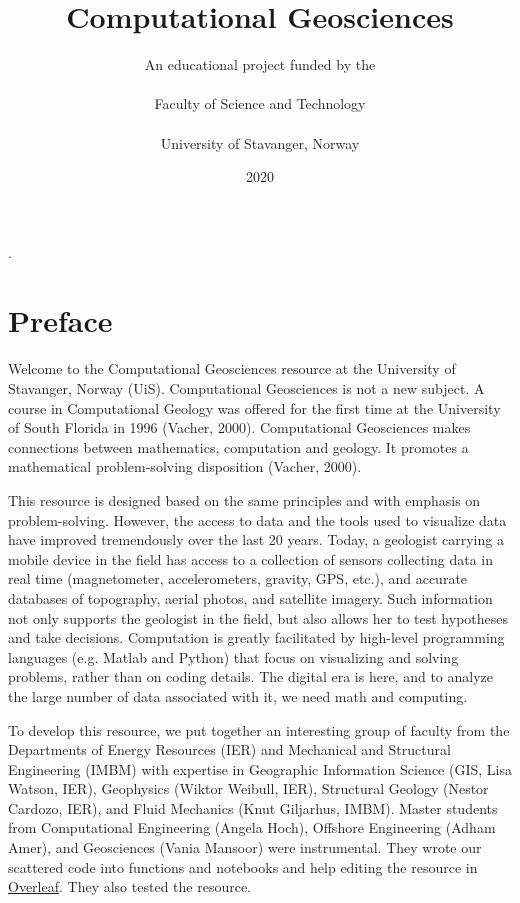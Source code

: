 \documentclass[a4paper , 12pt]{book}
\begin{document}

\lstset{style=mystyle}
\lstset{language=Python,upquote=true} %
\title{Computational Geosciences}
\author{An educational project funded by the \\ \\ Faculty of Science and Technology \\ \\ University of Stavanger, Norway}
\date{2020}

\setlength{\parindent}{0pt}.
\setlength{\parskip}{1em}
\renewcommand{\baselinestretch}{1.}

\maketitle
{}

\section*{Preface}

Welcome to the Computational Geosciences resource at the University of Stavanger, Norway (UiS). Computational Geosciences is not a new subject. A course in Computational Geology was offered for the first time at the University of South Florida in 1996 (Vacher, 2000). Computational Geosciences makes connections between mathematics, computation and geology. It promotes a mathematical problem-solving disposition (Vacher, 2000). 

This resource is designed based on the same principles and with emphasis on problem-solving. However, the access to data and the tools used to visualize data have improved tremendously over the last 20 years. Today, a geologist carrying a mobile device in the field has access to a collection of sensors collecting data in real time (magnetometer, accelerometers, gravity, GPS, etc.), and accurate databases of topography, aerial photos, and satellite imagery. Such information not only supports the geologist in the field, but also allows her to test hypotheses and take decisions. Computation is greatly facilitated by high-level programming languages (e.g. Matlab and Python) that focus on visualizing and solving problems, rather than on coding details. The digital era is here, and to analyze the large number of data associated with it, we need math and computing. 

To develop this resource, we put together an interesting group of faculty from the Departments of Energy Resources (IER) and Mechanical and Structural Engineering (IMBM) with expertise in Geographic Information Science (GIS, Lisa Watson, IER), Geophysics (Wiktor Weibull, IER), Structural Geology (Nestor Cardozo, IER), and Fluid Mechanics (Knut Giljarhus, IMBM). Master students from Computational Engineering (Angela Hoch), Offshore Engineering (Adham Amer), and Geosciences (Vania Mansoor) were instrumental. They wrote our scattered code into functions and notebooks and help editing the resource in \href {https://www.overleaf.com}{Overleaf}. They also tested the resource. 
\end{document}

